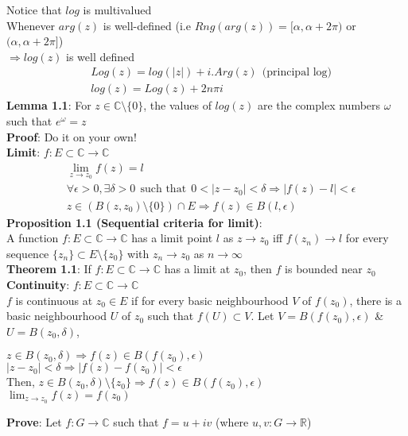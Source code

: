 \documentclass{article}
\begin{document}
\begin{flushleft}
Notice that $log$ is multivalued\\
\clearpage
Whenever $arg(z)$ is well-defined (i.e $Rng(arg(z))=[\alpha,\alpha+2\pi)$ or $(\alpha,\alpha+2\pi]$)\\$\Rightarrow log(z)$ is well defined
\begin{align}
&Log(z)=log(|z|)+i.Arg(z) \:\:\text{(principal log)} \nonumber\\
&log(z)=Log(z)+2n\pi i \nonumber
\end{align}
\textbf{Lemma 1.1}: For $z\in \mathds{C}\setminus \{0\}$, the values of $log(z)$ are the complex numbers $\omega$ such that $e^{\omega}=z$\\
\textbf{Proof}: Do it on your own!\\
\vspace{3mm}
\textbf{Limit}: $f: E\subset\mathds{C} \rightarrow \mathds{C}$
\begin{align}
&\lim_{z \to z_0} f(z)=l \nonumber\\
&\forall \epsilon>0,\exists \delta>0 \:\:\text{such that}\:\: 0<|z-z_0|<\delta \Rightarrow |f(z)-l|<\epsilon\nonumber\\
&z \in (B(z,z_0)\setminus\{0\})\cap E \Rightarrow f(z)\in B(l,\epsilon) \nonumber
\end{align}
\textbf{Proposition 1.1 (Sequential criteria for limit)}: \\ A function $f:E\subset  \mathds{C}\rightarrow \mathds{C}$ has a limit point $l$ as $z\rightarrow z_0$ iff $f(z_n)\rightarrow l$ for every sequence $\{z_n\}\subset E\setminus \{z_0\}$ with $z_n\rightarrow z_0$ as $n\rightarrow \infty$\\
\vspace{2mm}
\textbf{Theorem 1.1}: If $f:E\subset \mathds{C} \rightarrow \mathds{C}$ has a limit at $z_0$, then $f$ is bounded near $z_0$\\
\vspace{2mm}
\textbf{Continuity}: $f:E\subset \mathds{C}\rightarrow \mathds{C}$\\
$f$ is continuous at $z_0\in E$ if for every basic neighbourhood $V$ of $f(z_0)$, there is a basic neighbourhood $U$ of $z_0$ such that $f(U)\subset V$. Let $V=B(f(z_0),\epsilon)$ \& $U=B(z_0,\delta)$,
\begin{center}
$z\in B(z_0,\delta)\Rightarrow f(z)\in B(f(z_0),\epsilon)$\\
$|z-z_0|<\delta \Rightarrow |f(z)-f(z_0)|<\epsilon$\\
Then, $z\in B(z_0,\delta)\setminus \{z_0\} \Rightarrow f(z)\in B(f(z_0),\epsilon)$\\
$\lim_{z \to z_0} f(z)=f(z_0)$
\end{center}
\textbf{Prove}: Let $f:G\rightarrow \mathds{C}$ such that $f=u+ iv$ (where $u,v:G\rightarrow \mathds{R}$)


\end{flushleft}
\end{document}
